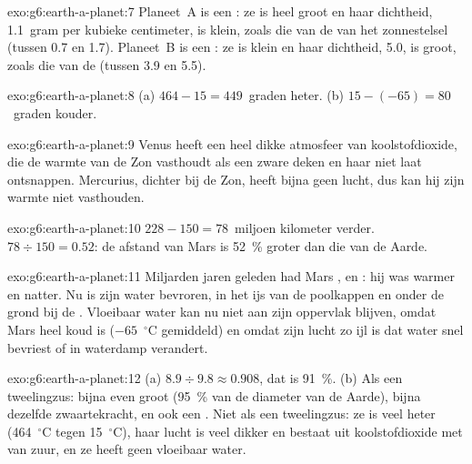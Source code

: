 \begin{solution}{exo:g6:earth-a-planet:7}
Planeet~A is een : ze is heel groot en haar dichtheid,
1.1~gram per kubieke centimeter, is klein, zoals die van de 
van het zonnestelsel (tussen 0.7 en 1.7). Planeet~B is een : ze
is klein en haar dichtheid, 5.0, is groot, zoals die van de 
(tussen 3.9 en 5.5).
\end{solution}

\begin{solution}{exo:g6:earth-a-planet:8}
(a) $464 - 15 = 449$~graden heter. (b) $15 - (-65) = 80$~graden kouder.
\end{solution}

\begin{solution}{exo:g6:earth-a-planet:9}
Venus heeft een heel dikke atmosfeer van koolstofdioxide, die de warmte
van de Zon vasthoudt als een zware deken en haar niet laat ontsnappen.
Mercurius, dichter bij de Zon, heeft bijna geen lucht, dus kan hij zijn
warmte niet vasthouden.
\end{solution}

\begin{solution}{exo:g6:earth-a-planet:10}
$228 - 150 = 78$~miljoen kilometer verder. $78 \div 150 = 0.52$: de afstand
van Mars is 52~\% groter dan die van de Aarde.
\end{solution}

\begin{solution}{exo:g6:earth-a-planet:11}
Miljarden jaren geleden had Mars ,  en : hij was
warmer en natter. Nu is zijn water bevroren, in het ijs van de poolkappen
en onder de grond bij de . Vloeibaar water kan nu niet aan zijn
oppervlak blijven, omdat Mars heel koud is ($-65$~$^\circ$C gemiddeld) en
omdat zijn lucht zo ijl is dat water snel bevriest of in waterdamp
verandert.
\end{solution}

\begin{solution}{exo:g6:earth-a-planet:12}
(a) $8.9 \div 9.8 \approx 0.908$, dat is 91~\%. (b) Als een tweelingzus:
bijna even groot (95~\% van de diameter van de Aarde), bijna dezelfde
zwaartekracht, en ook een . Niet als een tweelingzus: ze is veel
heter (464~$^\circ$C tegen 15~$^\circ$C), haar lucht is veel dikker en
bestaat uit koolstofdioxide met  van zuur, en ze heeft geen vloeibaar
water.
\end{solution}

